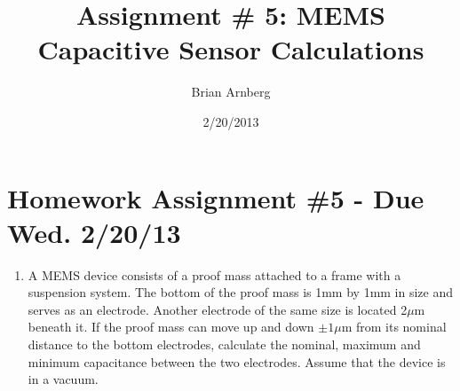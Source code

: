 \documentclass{article}
\title{Assignment \# 5: MEMS Capacitive Sensor Calculations}
\date{2/20/2013}
\author{Brian Arnberg}
\begin{document}
\label{start}



\section*{ Homework Assignment \#5 - Due Wed. 2/20/13 }
\renewcommand{\labelenumi}{\arabic{enumi})}

\begin{enumerate}
\item\label{p1}
 A MEMS device consists of a proof mass attached to a frame with a suspension
     system. The bottom of the proof mass is 1mm by 1mm in size and serves as an
     electrode. Another electrode of the same size is located 2$\mu$m beneath it. If the
     proof mass can move up and down $\pm 1\mu$m from its nominal distance to the bottom
     electrodes, calculate the nominal, maximum and minimum capacitance between
     the two electrodes. Assume that the device is in a vacuum.\\


\end{enumerate}
\end{document}
